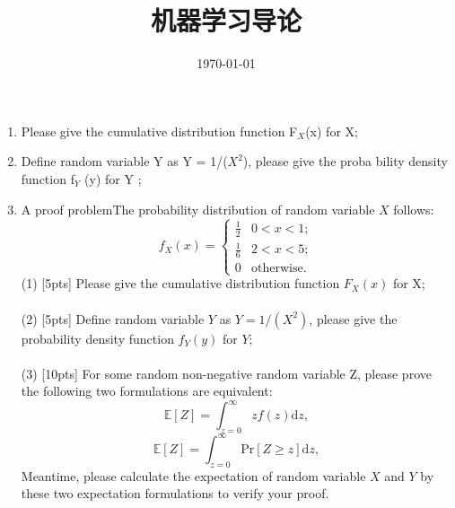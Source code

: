 \documentclass[11pt, a4paper, UTF8]{ctexart}
\title{机器学习导论}
\date{\today}
\begin{document}
\maketitle
\noplagiarism

\beginthishw
\begin{problem}[ML problem 1]
\begin{enumerate}
	\item Please give the cumulative distribution function F$_X$(x) for X;
	\item Define random variable Y as Y = 1/($X^2$), please give the proba
	bility density function f$_Y$ (y) for Y ;
	\item A proof problemThe probability distribution of random variable $X$ follows:\\
	\begin{equation}
	f_X(x)=\begin{cases}
	\frac{1}{2} & 0<x<1;\\
	\frac{1}{6} & 2<x<5;\\
	0 & \text{otherwise}.
	\end{cases}
	\end{equation} 
	(1) [5pts] Please give the cumulative distribution function $F_X(x)$ for X;\\ \\ 
	(2) [5pts] Define random variable $Y$ as $Y=1/(X^2)$, please give the probability density function $f_Y(y)$ for $Y$;\\ \\
	(3) [10pts] For some random non-negative random variable Z, please prove the following two formulations are equivalent:\\
	\begin{equation}
	\mathbb{E}[Z]=\int^\infty_{z=0} z f(z)\mathrm{d}z,
	\end{equation}
	\begin{equation}
	\mathbb{E}[Z]=\int^\infty_{z=0} \mathrm{Pr}[Z\geq z]\mathrm{d}z,
	\end{equation}
	Meantime, please calculate the expectation of random variable $X$ and $Y$ by these two expectation formulations to verify your proof.
\end{enumerate}

\end{problem}
\end{document}
